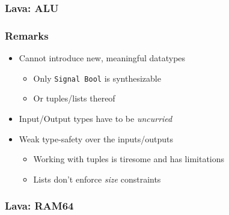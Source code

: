 \documentclass{beamer}
\begin{document}
            \begin{frame}
                \frametitle{Lava: ALU}
            \end{frame}

            \begin{frame}
                \frametitle{Remarks}

                \begin{itemize}
                    \item Cannot introduce new, meaningful datatypes
                        \begin{itemize}
                            \item Only \texttt{Signal Bool} is synthesizable
                            \item Or tuples/lists thereof
                        \end{itemize}
                    \item Input/Output types have to be \emph{uncurried}
                    \item Weak type-safety over the inputs/outputs
                        \begin{itemize}
                            \item Working with tuples is tiresome and has limitations
                            \item Lists don't enforce \emph{size} constraints
                        \end{itemize}
                \end{itemize}
            \end{frame}

            \begin{frame}
                \frametitle{Lava: RAM64}
            \end{frame}
\end{document}
